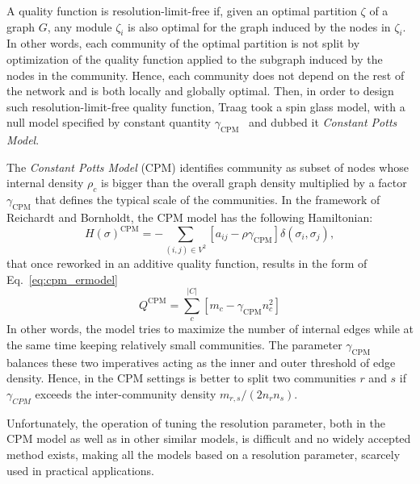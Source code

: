 A quality function is resolution-limit-free if, given an optimal partition $\zeta$ of a graph $G$, any module $\zeta_i$ is also optimal for the graph induced by the nodes in $\zeta_i$.
In other words, each community of the optimal partition is not split by optimization of the quality function applied to the subgraph induced by the nodes in the community.
Hence, each community does not depend on the rest of the network and is both locally and globally optimal.
Then, in order to design such resolution-limit-free quality function, Traag took a spin glass model, with a null model specified by constant quantity $\gamma_{\textrm{CPM}}$~\cite{traag2011} and dubbed it \emph{Constant Potts Model}.

The \emph{Constant Potts Model} (CPM) identifies community as subset of nodes whose internal density $\rho_c$ is bigger than the overall graph density multiplied by a factor $\gamma_{\textrm{CPM}}$ that defines the typical scale of the communities. In the framework of Reichardt and Bornholdt, the CPM model has the following Hamiltonian: 
\begin{equation}\label{eq:cpm_hamiltonian}
H(\sigma)^{\textrm{CPM}} = - \sum \limits_{(i,j) \in V^2} \left[ a_{ij} - \rho \gamma_{\textrm{CPM}} \right] \delta(\sigma_i,\sigma_j),
\end{equation}
that once reworked in an additive quality function, results in the form of Eq.~\ref{eq:cpm_ermodel}
\begin{equation}\label{eq:cpm_ermodel}
Q^{\textrm{CPM}} = \sum \limits_c^{|C|} \left[m_c - \gamma_{\textrm{CPM}} n_c^2 \right] 
\end{equation}
In other words, the model tries to maximize the number of internal edges while at the same time keeping relatively small communities. The parameter $\gamma_{\textrm{CPM}}$ balances these two imperatives acting as the inner and outer threshold of edge density.
Hence, in the CPM settings is better to split two communities $r$ and $s$ if $\gamma_{CPM}$ exceeds the inter-community density $m_{r,s}/(2n_r n_s)$.

Unfortunately, the operation of tuning the resolution parameter, both in the CPM model as well as in other similar models, is difficult and no widely accepted method exists, making all the models based on a resolution parameter, scarcely used in practical applications.


